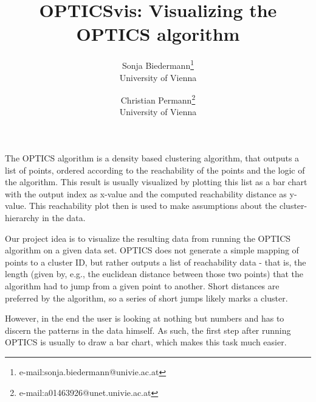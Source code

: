 \documentclass{vgtc}                          %
\title{OPTICSvis: Visualizing the OPTICS algorithm}
\author{Sonja Biedermann\thanks{e-mail:sonja.biedermann@univie.ac.at }\\ %
        \scriptsize University of Vienna %
\and Christian Permann\thanks{e-mail:a01463926@unet.univie.ac.at}\\ %
     \scriptsize  University of Vienna}
\begin{document}


\maketitle


\begin{flushleft}
The OPTICS algorithm is a density based clustering algorithm, that outputs a list of points,
 ordered according to the reachability of the points and the logic of the algorithm.
This result is usually visualized by plotting this list as a bar chart with the output index as x-value and the
computed reachability distance as y-value. This reachability plot then is used to make assumptions about
the cluster-hierarchy in the data.
\end{flushleft}

\begin{flushleft}
Our project idea is to visualize the resulting data from running the OPTICS algorithm on a given data set. OPTICS does not generate a simple mapping of points to a cluster ID, but rather outputs a list of reachability data - that is, the length (given by, e.g., the euclidean distance between those two points) that the algorithm had to jump from a given point to another. Short distances are preferred by the algorithm, so a series of short jumps likely marks a cluster.
\end{flushleft}

\begin{flushleft}
However, in the end the user is looking at nothing but numbers and has to discern the patterns in the data himself. As such, the first step after running OPTICS is usually to draw a bar chart, which makes this task much easier.
\end{flushleft}
\end{document}
